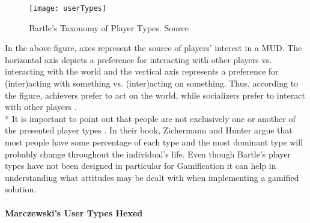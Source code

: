 \begin{figure}[h]
    \centering
    \texttt{[image: userTypes]}
    \caption{Bartle's Taxonomy of Player Types. Source \cite{bartle}}
    \label{fig:userTypes}
\end{figure}
In the above figure, axes represent the source of players' interest in a MUD. The horizontal axis depicts a preference for interacting with other players vs. interacting with the world and the vertical axis represents a preference for (inter)acting with something vs. (inter)acting on something. Thus, according to the figure, achievers prefer to act on the world, while socializers prefer to interact with other players \cite{bartle}. \\*
It is important to point out that people are not exclusively one or another of the presented player types \cite{zichermann2011gamification}. In their book, Zichermann and Hunter argue that most people have some percentage of each type and the most dominant type will probably change throughout the individual's life. Even though Bartle's player types have not been designed in particular for Gamification it can  help in understanding what attitudes may be dealt with when implementing a gamified solution. 

\paragraph{Marczewski's User Types Hexed}

